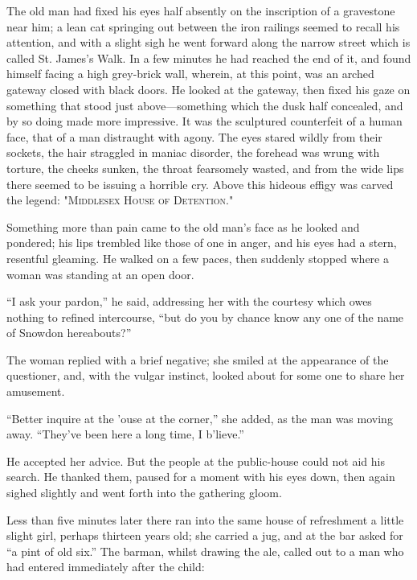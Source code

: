 The old man had fixed his eyes half absently on the inscription of a
gravestone near him; a lean cat springing out between the iron railings
seemed to recall his attention, and with a slight sigh he went forward
along the narrow street which is called St. James's Walk. In a few
minutes he had reached the end of it, and found himself facing a high
grey-brick wall, wherein, at this point, was an arched gateway closed
with black doors. He looked at the gateway, then fixed his gaze on
something that stood just above---something which the dusk half
concealed, and by so doing made more impressive. It was the sculptured
counterfeit of a human face, that of a man distraught with agony. The
eyes stared wildly from their sockets, the hair straggled in maniac
disorder, the forehead was wrung with torture, the cheeks sunken, the
throat fearsomely wasted, and from the wide lips there seemed to be
issuing a {\protect\hypertarget{5}{}{}}horrible cry. Above this hideous
effigy was carved the legend: "\textsc{Middlesex House of Detention}."

Something more than pain came to the old man's face as he looked and
pondered; his lips trembled like those of one in anger, and his eyes had
a stern, resentful gleaming. He walked on a few paces, then suddenly
stopped where a woman was standing at an open door.

``I ask your pardon,'' he said, addressing her with the courtesy which
owes nothing to refined intercourse, ``but do you by chance know any one
of the name of Snowdon hereabouts?''

The woman replied with a brief negative; she smiled at the appearance of
the questioner, and, with the vulgar instinct, looked about for some one
to share her amusement.

``Better inquire at the 'ouse at the corner,'' she added, as the man was
moving away. ``They've been here a long time, I b'lieve.''

He accepted her advice. But the people {\protect\hypertarget{6}{}{}}at
the public-house could not aid his search. He thanked them, paused for a
moment with his eyes down, then again sighed slightly and went forth
into the gathering gloom.

Less than five minutes later there ran into the same house of
refreshment a little slight girl, perhaps thirteen years old; she
carried a jug, and at the bar asked for ``a pint of old six.'' The
barman, whilst drawing the ale, called out to a man who had entered
immediately after the child:

